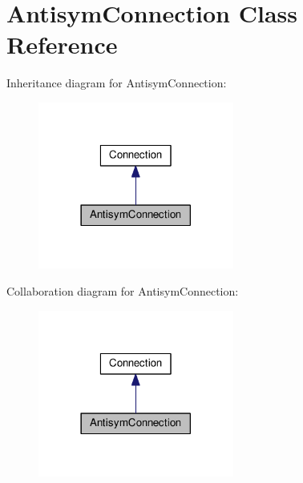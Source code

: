 \hypertarget{classAntisymConnection}{}\section{Antisym\+Connection Class Reference}
\label{classAntisymConnection}


Inheritance diagram for Antisym\+Connection\+:\nopagebreak
\begin{figure}[H]
\begin{center}
\leavevmode
\includegraphics[width=182pt]{classAntisymConnection__inherit__graph}
\end{center}
\end{figure}


Collaboration diagram for Antisym\+Connection\+:\nopagebreak
\begin{figure}[H]
\begin{center}
\leavevmode
\includegraphics[width=182pt]{classAntisymConnection__coll__graph}
\end{center}
\end{figure}

